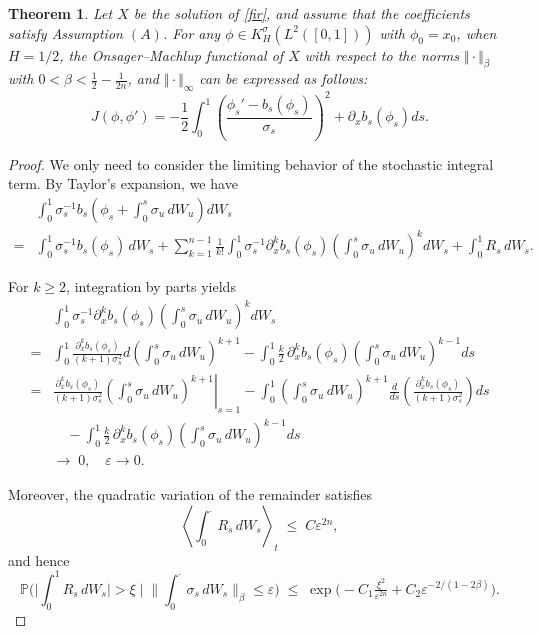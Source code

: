 \documentclass[preprint,12pt]{elsarticle}
\newtheorem{theorem}{Theorem}[section]
\theoremstyle{definition}  %
\theoremstyle{plain}  %
\begin{document}
\begin{theorem}  \label{result3}
Let $X$ be the solution of \eqref{fir}, and assume that the coefficients satisfy Assumption \((A)\).
For any $\phi \in K_H^\sigma(L^2([0,1]))$ with $\phi_0 = x_0$, when $  H =1/2$, the Onsager--Machlup functional of $X$ with respect to the norms
$\Vert \cdot \Vert_\beta$ with $0<\beta<\frac{1}{2}-\frac{1}{2n}$, and $\Vert \cdot\Vert_\infty$ can be expressed as follows:
	\begin{equation*}
	J(\phi,\phi')=-\frac{1}{2} \int_0^1 \left(\frac{\phi_s' - b_s\left(\phi_s\right)}{\sigma_s}\right)^2+ \partial_xb_s(\phi_s)ds.
	\end{equation*}
    \end{theorem}
	\begin{proof}
   We only need to consider the limiting behavior of the stochastic integral term.  
By Taylor’s expansion, we have
\begin{align*}
	&\int_0^1 \sigma_s^{-1} b_s\!\left(\phi_s+\int_0^s \sigma_u \, dW_u\right) dW_s\\
	=& \int_0^1 \sigma_s^{-1} b_s(\phi_s)\, dW_s + \sum_{k=1}^{n-1} \frac{1}{k!}\int_0^1 \sigma_s^{-1}\partial_x^k b_s(\phi_s) 
	\left(\int_0^s \sigma_u \, dW_u\right)^k dW_s + \int_0^1 R_s \, dW_s .
\end{align*}

For $k \geq 2$, integration by parts yields
\begin{align*}
	&\int_0^1 \sigma_s^{-1}\partial_x^k b_s(\phi_s) 
	\left(\int_0^s \sigma_u \, dW_u\right)^k dW_s \\
	=& \int_0^1 \frac{\partial_x^k b_s(\phi_s)}{(k+1)\sigma_s^2} 
	   d\!\left(\int_0^s \sigma_u \, dW_u\right)^{k+1} - \int_0^1 \frac{k}{2}\, \partial_x^k b_s(\phi_s) 
	   \left(\int_0^s \sigma_u \, dW_u\right)^{k-1} ds \\
	=& \left. \frac{\partial_x^k b_s(\phi_s)}{(k+1)\sigma_s^2} 
	   \left(\int_0^s \sigma_u \, dW_u\right)^{k+1}\right|_{s=1}  - \int_0^1 \left(\int_0^s \sigma_u \, dW_u\right)^{k+1} 
	\frac{d}{ds}\!\left(\frac{\partial_x^k b_s(\phi_s)}{(k+1)\sigma_s^2}\right) ds \\
	&\quad - \int_0^1 \frac{k}{2}\, \partial_x^k b_s(\phi_s) 
	\left(\int_0^s \sigma_u \, dW_u\right)^{k-1} ds \\
    &\longrightarrow\; 0, \quad \varepsilon \to 0 .
\end{align*}

Moreover, the quadratic variation of the remainder satisfies
\begin{equation*}
	\left\langle \int_0^\cdot R_s \, dW_s \right\rangle_t \;\leq\; C \varepsilon^{2n},
\end{equation*}
and hence
\[
\mathbb{P}\!\Bigg(
   \Big|\int_0^1 R_s \, dW_s\Big| > \xi 
   \;\Big|\; \Big\|\int_0^{\cdot}\sigma_s \, dW_s\Big\|_{\beta} \leq \varepsilon
\Bigg)
\;\leq\;
\exp\!\Big(-C_1 \tfrac{\xi^2}{\varepsilon^{2n}} + C_2 \varepsilon^{-2/(1-2\beta)}\Big).
\]


\end{proof}
\end{document}
